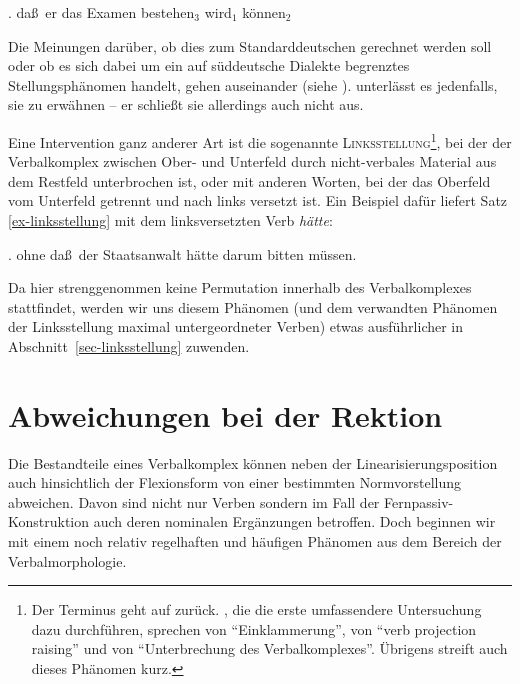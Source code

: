 \ex. da\ss\ er das Examen bestehen$_3$ wird$_1$ können$_2$ \hfill \citep[(138)]{Meurers:99}\label{ex-zwischenstellung}

Die Meinungen darüber, ob dies zum Standarddeutschen gerechnet werden soll oder ob es sich dabei um ein auf süddeutsche Dialekte begrenztes Stellungsphänomen handelt, gehen auseinander (siehe \citealt[84ff]{Meurers:99}). \cite{Bech:55} unterlässt es jedenfalls, sie zu erwähnen -- er schlie\ss t sie allerdings auch nicht aus.

Eine Intervention ganz anderer Art ist die sogenannte \textsc{Linksstellung}\footnote{Der Terminus geht auf \citet[218ff]{Meurers:97} zurück. \cite{Kefer:Lejeune:74}, die die erste umfassendere Untersuchung dazu durchführen, sprechen von "`Einklammerung"', \citet{Haegeman:Riemsdijk:86} von "`verb projection raising"' und \citet[Abs.~14.3]{Mueller:99} von "`Unterbrechung des Verbalkomplexes"'. Übrigens streift auch \citet[\S63]{Bech:55} dieses Phänomen kurz.}, bei der der Verbalkomplex zwischen Ober- und Unterfeld durch nicht-verbales Material aus dem Restfeld unterbrochen ist, oder mit anderen Worten, bei der das Oberfeld vom Unterfeld getrennt und nach links versetzt ist. Ein Beispiel dafür liefert Satz \ref{ex-linksstellung} mit dem linksversetzten Verb {\it hätte}:

\ex. \label{ex-linksstellung} ohne da\ss\ der Staatsanwalt hätte darum bitten müssen. \hfill \citep[(145a)]{Meurers:99}  

Da hier strenggenommen keine Permutation innerhalb des Verbalkomplexes \linebreak stattfindet, werden wir uns diesem Phänomen (und dem verwandten Phänomen der Linksstellung maximal untergeordneter Verben) etwas ausführlicher in Ab\-schnitt~\ref{sec-linksstellung} zuwenden.   


\section{Abweichungen bei der Rektion} \label{sec-abweichung-rektion}

Die Bestandteile eines Verbalkomplex können neben der Linearisierungsposition auch hinsichtlich der Flexionsform von einer bestimmten Normvorstellung abweichen. Davon sind nicht nur Verben sondern im Fall der Fernpassiv-Konstruk\-tion auch deren nominalen Ergänzungen betroffen. Doch beginnen wir mit einem noch relativ regelhaften und häufigen Phänomen aus dem Bereich der Verbalmorphologie.  

